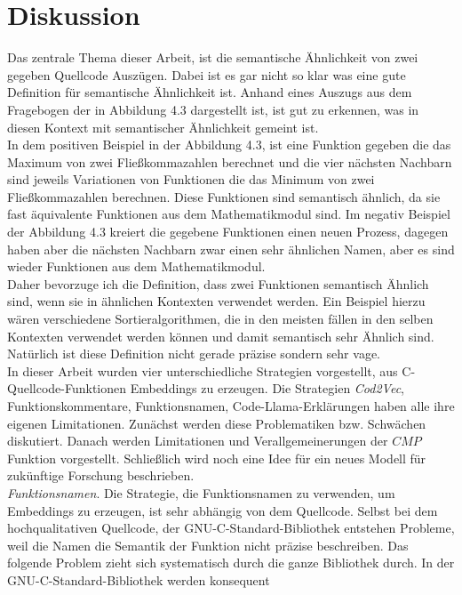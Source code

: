 \documentclass[12pt,letterpaper,ngerman]{article}
\begin{document}
\section{Diskussion}
Das zentrale Thema dieser Arbeit, ist die semantische Ähnlichkeit
von zwei gegeben Quellcode Auszügen. Dabei ist es gar nicht so klar 
was eine gute Definition für semantische Ähnlichkeit ist.
Anhand eines Auszugs aus dem Fragebogen der in Abbildung 4.3 
dargestellt ist, ist gut zu erkennen,
was in diesen Kontext mit semantischer Ähnlichkeit gemeint ist.\\
In dem positiven Beispiel in der Abbildung 4.3, ist eine Funktion
gegeben die das Maximum von zwei Fließkommazahlen berechnet und die
vier
nächsten Nachbarn sind jeweils Variationen von Funktionen die das
Minimum von zwei Fließkommazahlen berechnen. Diese Funktionen sind
semantisch ähnlich, da sie fast äquivalente Funktionen aus dem
Mathematikmodul sind. Im negativ Beispiel der Abbildung 4.3 kreiert
die gegebene Funktionen einen neuen Prozess, dagegen haben aber die 
nächsten Nachbarn zwar einen sehr ähnlichen Namen, aber es sind 
wieder Funktionen aus dem Mathematikmodul.\\
Daher bevorzuge ich die Definition, dass zwei Funktionen semantisch
Ähnlich sind, wenn sie in ähnlichen Kontexten verwendet werden. 
Ein Beispiel hierzu wären verschiedene Sortieralgorithmen, die in 
den meisten fällen in den selben Kontexten verwendet werden können 
und damit semantisch sehr Ähnlich sind. Natürlich ist diese 
Definition nicht gerade präzise sondern sehr vage.\\
In dieser Arbeit wurden vier unterschiedliche Strategien
vorgestellt, aus C-Quellcode-Funktionen Embeddings zu erzeugen.
Die Strategien \textit{Cod2Vec}, Funktionskommentare, 
Funktionsnamen, Code-Llama-Erklärungen haben alle ihre 
eigenen Limitationen. Zunächst werden diese Problematiken
bzw. Schwächen diskutiert. Danach werden Limitationen 
und Verallgemeinerungen der $CMP$ Funktion vorgestellt.
Schließlich wird noch eine Idee für ein neues Modell 
für zukünftige Forschung beschrieben.
\pagebreak\\
\textit{Funktionsnamen}. Die Strategie, die Funktionsnamen zu 
verwenden, um Embeddings zu erzeugen, ist sehr abhängig von 
dem Quellcode. Selbst bei dem hochqualitativen Quellcode, 
der GNU-C-Standard-Bibliothek entstehen Probleme, weil die 
Namen die Semantik der Funktion nicht präzise beschreiben.
Das folgende Problem zieht sich systematisch durch die 
ganze Bibliothek durch. In der GNU-C-Standard-Bibliothek
werden konsequent 
\end{document}
